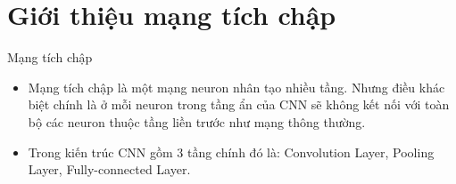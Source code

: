 \documentclass[compress]{beamer}
\begin{document}
\section{Giới thiệu mạng tích chập}
\begin{frame}{Mạng tích chập}
\begin{itemize}
\item Mạng tích chập là một mạng neuron nhân tạo nhiều tầng. Nhưng điều khác biệt chính là ở mỗi neuron trong tầng ẩn của CNN sẽ không kết nối với toàn bộ các neuron thuộc tầng liền trước như mạng thông thường.
\item Trong kiến trúc CNN gồm 3 tầng chính đó là: Convolution Layer, Pooling Layer, Fully-connected Layer.
\end{itemize}

\end{frame}
\end{document}
